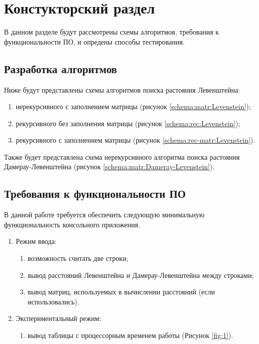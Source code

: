 \chapter{Констукторский раздел}
\label{cha:design}
    В данном разделе будут рассмотрены схемы алгоритмов, требования к функциональности ПО,
    и опредены способы тестирования.
    
    \section{Разработка алгоритмов}
        Ниже будут представлены схемы алгоритмов поиска растояния Левенштейна: \begin{enumerate}
            \item нерекурсивного с заполнением матрицы (рисунок \ref{schema:matr:Levenstein});
            \item рекурсивного без заполнения матрицы (рисунок \ref{schema:rec:Levenstein});
            \item рекурсивного с заполнением матрицы (рисунок \ref{schema:rec-matr:Levenstein}).
        \end{enumerate}

        Также будет представлена схема нерекурсивного алгоритма поиска растояния Дамерау-Левенштейна (рисунок \ref{schema:matr:Dameray-Levenstein}).

    \section{Требования к функциональности ПО}
        В данной работе требуется обеспечить следующую минимальную функциональность консольного приложения.
        \begin{enumerate}
            \item Режим ввода:
            \begin{enumerate}
                \item возможность считать две строки;
                \item вывод расстояний Левенштейна и Дамерау-Левенштейна между строками;
                \item вывод матриц, используемых в вычислении расстояний (если использовались).
            \end{enumerate}
            \item Экспериментальный режим: 
            \begin{enumerate}
                \item вывод таблицы с процессорным временем работы (Рисунок \ref{fig:1}).
            \end{enumerate}
        \end{enumerate}
        
